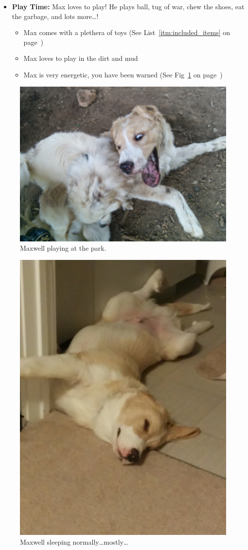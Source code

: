 \documentclass[pdftex,12pt]{article}
\begin{document}
\begin{itemize}
        once in the evening. He also receives water during each meal.
        \begin{itemize}
            \item Each meal consists of 1.5 cups of dog food
                  (See Fig~\ref{fig:food_bowl_filled} on
                  page~\pageref{fig:food_bowl_filled})
            \item Max is trained to wait til eating
                  (See Fig~\ref{fig:food_container_open} on
                  page~\pageref{fig:food_container_open})
            \item Max eats fast, and he must be walked immediatly after dinner
        \end{itemize}
    \item \textbf{Play Time:} Max loves to play! He plays ball, tug of war, chew
        the shoes, eat the garbage, and lots more\ldots!
        \begin{itemize}
            \item Max comes with a plethera of toys
                  (See List~\ref{itm:included_items} on
                  page~\pageref{itm:included_items})
            \item Max loves to play in the dirt and mud
            \item Max is very energetic, you have been warned
                  (See Fig~\ref{fig:at_the_park} on
                  page~\pageref{fig:at_the_park})
        \end{itemize}
\end{itemize}

\bigskip

\begin{figure}[h!]
    \centering
    \includegraphics[width=.35\textwidth]{./images/max/at_the_park.jpg}
    \caption{Maxwell playing at the park.}
    \label{fig:at_the_park}
\end{figure}

\bigskip

\begin{figure}[h!]
    \centering
    \includegraphics[width=.35\textwidth]{./images/max/sleeping.jpg}
    \caption{Maxwell sleeping normally\ldots mostly\ldots}
    \label{fig:sleeping}
\end{figure}
\end{document}

